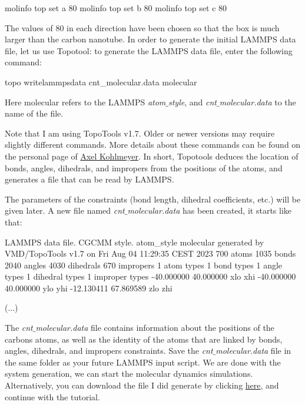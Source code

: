 \begin{lcverbatim}
molinfo top set a 80  
molinfo top set b 80            
molinfo top set c 80 
\end{lcverbatim}

\noindent The values of 80 in each direction have been chosen
so that the box is much larger than the carbon nanotube.
In order to generate the initial LAMMPS data file, let us use Topotool:
to generate the LAMMPS data file, enter the following command:

\begin{lcverbatim}
topo writelammpsdata cnt_molecular.data molecular
\end{lcverbatim}

\noindent Here molecular refers to the LAMMPS \textit{atom$\_$style}, and
\textit{cnt$\_$molecular.data} to the name of the file. 

\begin{tcolorbox}[colback=mylightblue!5!white,colframe=mylightblue!75!black,title=About TopoTools]
Note that I am using TopoTools v1.7. Older or newer versions 
may require slightly different commands. 
More details about these commands can be found on the
personal page of \href{https://sites.google.com/site/akohlmey/software/topotools}{Axel Kohlmeyer}.
In short, Topotools deduces the location of bonds, angles,
dihedrals, and impropers from the positions of the atoms,
and generates a file that can be read by LAMMPS.
\end{tcolorbox}

\noindent The parameters of the constraints (bond length,
dihedral coefficients, etc.) will be given later.
A new file named \textit{cnt$\_$molecular.data} has been created, it starts
like that:

\begin{lcverbatim}
LAMMPS data file. CGCMM style. atom_style molecular generated by VMD/TopoTools v1.7 on Fri Aug 04 11:29:35 CEST 2023
700 atoms
1035 bonds
2040 angles
4030 dihedrals
670 impropers
1 atom types
1 bond types
1 angle types
1 dihedral types
1 improper types
-40.000000 40.000000  xlo xhi
-40.000000 40.000000  ylo yhi
-12.130411 67.869589  zlo zhi

(...)
\end{lcverbatim}

\noindent The \textit{cnt$\_$molecular.data} file contains information
about the positions of the carbons atoms, as well as the
identity of the atoms that are linked by bonds, angles, dihedrals,
and impropers constraints.
Save the \textit{cnt$\_$molecular.data} file in the same folder as your
future LAMMPS input script.
We are done with the system
generation, we can start the molecular dynamics simulations.
Alternatively, you can download the file I did generate 
by clicking  \href{../../../../../inputs/level1/breaking-a-carbon-nanotube/unbreakable-bonds/cnt_molecular.data}{here}, and continue with the tutorial.

